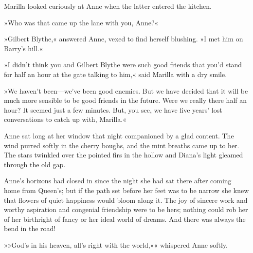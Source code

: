 Marilla looked curiously at Anne when the latter entered the kitchen.

»Who was that came up the lane with you, Anne?«

»Gilbert Blythe,« answered Anne, vexed to find herself blushing. »I met him on Barry’s hill.«

»I didn’t think you and Gilbert Blythe were such good friends that you’d stand for half an hour at the gate talking to him,« said Marilla with a dry smile.

»We haven’t been—we’ve been good enemies. But we have decided that it will be much more sensible to be good friends in the future. Were we really there half an hour? It seemed just a few minutes. But, you see, we have five years’ lost conversations to catch up with, Marilla.«

Anne sat long at her window that night companioned by a glad content. The wind purred softly in the cherry boughs, and the mint breaths came up to her. The stars twinkled over the pointed firs in the hollow and Diana’s light gleamed through the old gap.

Anne’s horizons had closed in since the night she had sat there after coming home from Queen’s; but if the path set before her feet was to be narrow she knew that flowers of quiet happiness would bloom along it. The joy of sincere work and worthy aspiration and congenial friendship were to be hers; nothing could rob her of her birthright of fancy or her ideal world of dreams. And there was always the bend in the road!

»»God's in his heaven, all’s right with the world,«« whispered Anne softly.